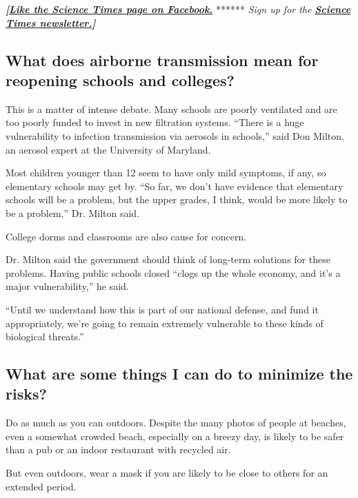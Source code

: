 \textbf{\emph{{[}}\href{http://on.fb.me/1paTQ1h}{\emph{Like the Science
Times page on Facebook.}}} ****** \emph{\textbar{} Sign up for the}
\textbf{\href{http://nyti.ms/1MbHaRU}{\emph{Science Times
newsletter.}}\emph{{]}}}

\hypertarget{what-does-airborne-transmission-mean-for-reopening-schools-and-colleges}{%
\subsection{What does airborne transmission mean for reopening schools
and
colleges?}\label{what-does-airborne-transmission-mean-for-reopening-schools-and-colleges}}

This is a matter of intense debate. Many schools are poorly ventilated
and are too poorly funded to invest in new filtration systems. ``There
is a huge vulnerability to infection transmission via aerosols in
schools,'' said Don Milton, an aerosol expert at the University of
Maryland.

Most children younger than 12 seem to have only mild symptoms, if any,
so elementary schools may get by. ``So far, we don't have evidence that
elementary schools will be a problem, but the upper grades, I think,
would be more likely to be a problem,'' Dr. Milton said.

College dorms and classrooms are also cause for concern.

Dr. Milton said the government should think of long-term solutions for
these problems. Having public schools closed ``clogs up the whole
economy, and it's a major vulnerability,'' he said.

``Until we understand how this is part of our national defense, and fund
it appropriately, we're going to remain extremely vulnerable to these
kinds of biological threats.''

\hypertarget{what-are-some-things-i-can-do-to-minimize-the-risks}{%
\subsection{What are some things I can do to minimize the
risks?}\label{what-are-some-things-i-can-do-to-minimize-the-risks}}

Do as much as you can outdoors. Despite the many photos of people at
beaches, even a somewhat crowded beach, especially on a breezy day, is
likely to be safer than a pub or an indoor restaurant with recycled air.

But even outdoors, wear a mask if you are likely to be close to others
for an extended period.

